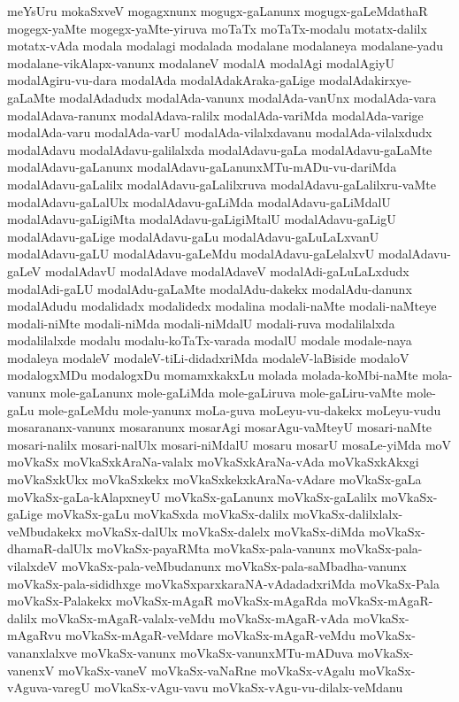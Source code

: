 {meYsUru
mokaSxveV
mogagxnunx
mogugx-gaLanunx
mogugx-gaLeMdathaR
mogegx-yaMte
mogegx-yaMte-yiruva
moTaTx
moTaTx-modalu
motatx-dalilx
motatx-vAda
modala
modalagi
modalada
modalane
modalaneya
modalane-yadu
modalane-vikAlapx-vanunx
modalaneV
modalA
modalAgi
modalAgiyU
modalAgiru-vu-dara
modalAda
modalAdakAraka-gaLige
modalAdakirxye-gaLaMte
modalAdadudx
modalAda-vanunx
modalAda-vanUnx
modalAda-vara
modalAdava-ranunx
modalAdava-ralilx
modalAda-variMda
modalAda-varige
modalAda-varu
modalAda-varU
modalAda-vilalxdavanu
modalAda-vilalxdudx
modalAdavu
modalAdavu-galilalxda
modalAdavu-gaLa
modalAdavu-gaLaMte
modalAdavu-gaLanunx
modalAdavu-gaLanunxMTu-mADu-vu-dariMda
modalAdavu-gaLalilx
modalAdavu-gaLalilxruva
modalAdavu-gaLalilxru-vaMte
modalAdavu-gaLalUlx
modalAdavu-gaLiMda
modalAdavu-gaLiMdalU
modalAdavu-gaLigiMta
modalAdavu-gaLigiMtalU
modalAdavu-gaLigU
modalAdavu-gaLige
modalAdavu-gaLu
modalAdavu-gaLuLaLxvanU
modalAdavu-gaLU
modalAdavu-gaLeMdu
modalAdavu-gaLelalxvU
modalAdavu-gaLeV
modalAdavU
modalAdave
modalAdaveV
modalAdi-gaLuLaLxdudx
modalAdi-gaLU
modalAdu-gaLaMte
modalAdu-dakekx
modalAdu-danunx
modalAdudu
modalidadx
modalidedx
modalina
modali-naMte
modali-naMteye
modali-niMte
modali-niMda
modali-niMdalU
modali-ruva
modalilalxda
modalilalxde
modalu
modalu-koTaTx-varada
modalU
modale
modale-naya
modaleya
modaleV
modaleV-tiLi-didadxriMda
modaleV-laBiside
modaloV
modalogxMDu
modalogxDu
momamxkakxLu
molada
molada-koMbi-naMte
mola-vanunx
mole-gaLanunx
mole-gaLiMda
mole-gaLiruva
mole-gaLiru-vaMte
mole-gaLu
mole-gaLeMdu
mole-yanunx
moLa-guva
moLeyu-vu-dakekx
moLeyu-vudu
mosarananx-vanunx
mosaranunx
mosarAgi
mosarAgu-vaMteyU
mosari-naMte
mosari-nalilx
mosari-nalUlx
mosari-niMdalU
mosaru
mosarU
mosaLe-yiMda
moV
moVkaSx
moVkaSxkAraNa-valalx
moVkaSxkAraNa-vAda
moVkaSxkAkxgi
moVkaSxkUkx
moVkaSxkekx
moVkaSxkekxkAraNa-vAdare
moVkaSx-gaLa
moVkaSx-gaLa-kAlapxneyU
moVkaSx-gaLanunx
moVkaSx-gaLalilx
moVkaSx-gaLige
moVkaSx-gaLu
moVkaSxda
moVkaSx-dalilx
moVkaSx-dalilxlalx-veMbudakekx
moVkaSx-dalUlx
moVkaSx-dalelx
moVkaSx-diMda
moVkaSx-dhamaR-dalUlx
moVkaSx-payaRMta
moVkaSx-pala-vanunx
moVkaSx-pala-vilalxdeV
moVkaSx-pala-veMbudanunx
moVkaSx-pala-saMbadha-vanunx
moVkaSx-pala-sididhxge
moVkaSxparxkaraNA-vAdadadxriMda
moVkaSx-Pala
moVkaSx-Palakekx
moVkaSx-mAgaR
moVkaSx-mAgaRda
moVkaSx-mAgaR-dalilx
moVkaSx-mAgaR-valalx-veMdu
moVkaSx-mAgaR-vAda
moVkaSx-mAgaRvu
moVkaSx-mAgaR-veMdare
moVkaSx-mAgaR-veMdu
moVkaSx-vananxlalxve
moVkaSx-vanunx
moVkaSx-vanunxMTu-mADuva
moVkaSx-vanenxV
moVkaSx-vaneV
moVkaSx-vaNaRne
moVkaSx-vAgalu
moVkaSx-vAguva-varegU
moVkaSx-vAgu-vavu
moVkaSx-vAgu-vu-dilalx-veMdanu
}
